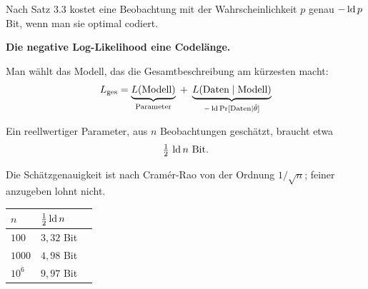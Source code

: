 \begin{merksatz}
Nach Satz 3.3 kostet eine Beobachtung mit der Wahrscheinlichkeit $p$ genau $-\operatorname{ld} p$ Bit, wenn man sie optimal codiert.

\begin{center}
\begin{minipage}{0.9\textwidth}
\textbf{Die negative Log-Likelihood  eine Codelänge.}
\end{minipage}
\end{center}

Man wählt das Modell, das die Gesamtbeschreibung am kürzesten macht:
\[ L_{\text{ges}} = \underbrace{L(\text{Modell})}_{\text{Parameter}} \;+\; \underbrace{L(\text{Daten}\mid\text{Modell})}_{-\operatorname{ld} \Pr[\text{Daten}\mid\hat\theta]} \]

\begin{center}
\begin{minipage}{0.88\textwidth}
\end{minipage}
\end{center}

Ein reellwertiger Parameter, aus $n$ Beobachtungen geschätzt, braucht etwa
\[ \tfrac12\,\operatorname{ld} n \ \text{Bit} . \]

 Die Schätzgenauigkeit ist nach Cramér-Rao von der Ordnung $1/\sqrt n$; feiner anzugeben lohnt nicht.

\begin{center}
\renewcommand{\arraystretch}{1.46}
\begin{tabular}{@{}P{2.0cm}P{2.4cm}P{2.6cm}@{}}
\toprule
$n$ & $\tfrac12\operatorname{ld} n$ & \\
\midrule
$100$ & $3{,}32$ Bit & \\
$1000$ & $4{,}98$ Bit & \\
$10^{6}$ & $9{,}97$ Bit & \\
\bottomrule
\end{tabular}
\end{center}
\end{merksatz}


